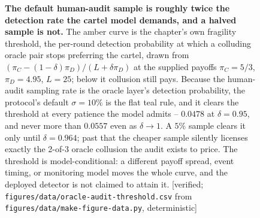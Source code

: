 \begin{figure}[H]
\vspace{2mm}
\caption{\textbf{The default human-audit sample is roughly twice the detection
rate the cartel model demands, and a halved sample is not.} The amber curve is
the chapter's own fragility threshold, the per-round detection probability at
which a colluding oracle pair stops preferring the cartel, drawn from
$(\pi_C-(1-\delta)\pi_D)/(L+\delta\pi_D)$ at the supplied payoffs
$\pi_C=5/3$, $\pi_D=4.95$, $L=25$; below it collusion still pays. Because the
human-audit sampling rate is the oracle layer's detection probability, the
protocol's default $\sigma=10\%$ is the flat teal rule, and it clears the
threshold at every patience the model admits -- $0.0478$ at $\delta=0.95$, and
never more than $0.0557$ even as $\delta\to1$. A $5\%$ sample clears it only
until $\delta=0.964$; past that the cheaper sample silently licenses exactly the
2-of-3 oracle collusion the audit exists to price. The threshold is
model-conditional: a different payoff spread, event timing, or monitoring model
moves the whole curve, and the deployed detector is not claimed to attain it.
[verified; \texttt{figures/data/oracle-audit-threshold.csv} from
\texttt{figures/data/make-figure-data.py}, deterministic]}
\label{fig:bc-oracle-audit-rate}
\end{figure}

